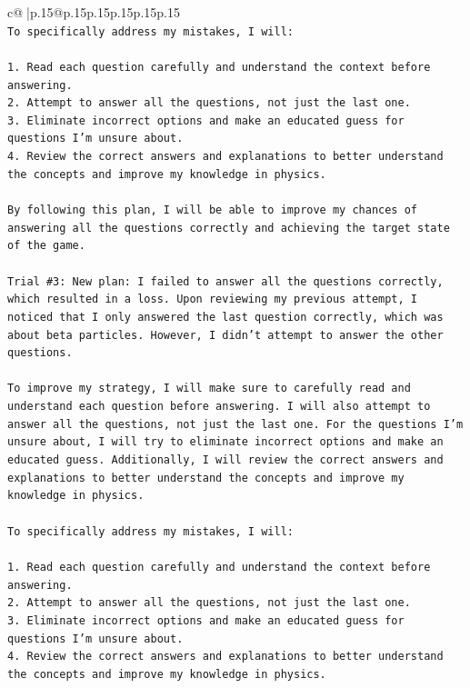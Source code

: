 \documentclass{article}
\begin{document}
{\begin{supertabular}{c@{$\;$}|p{.15\linewidth}@{}p{.15\linewidth}p{.15\linewidth}p{.15\linewidth}p{.15\linewidth}p{.15\linewidth}}
{{{\\ 
\texttt{To specifically address my mistakes, I will:} \\
\\ 
\texttt{1. Read each question carefully and understand the context before answering.} \\
\texttt{2. Attempt to answer all the questions, not just the last one.} \\
\texttt{3. Eliminate incorrect options and make an educated guess for questions I'm unsure about.} \\
\texttt{4. Review the correct answers and explanations to better understand the concepts and improve my knowledge in physics.} \\
\\ 
\texttt{By following this plan, I will be able to improve my chances of answering all the questions correctly and achieving the target state of the game.} \\
\\ 
\texttt{Trial \#3: New plan: I failed to answer all the questions correctly, which resulted in a loss. Upon reviewing my previous attempt, I noticed that I only answered the last question correctly, which was about beta particles. However, I didn't attempt to answer the other questions. } \\
\\ 
\texttt{To improve my strategy, I will make sure to carefully read and understand each question before answering. I will also attempt to answer all the questions, not just the last one. For the questions I'm unsure about, I will try to eliminate incorrect options and make an educated guess. Additionally, I will review the correct answers and explanations to better understand the concepts and improve my knowledge in physics.} \\
\\ 
\texttt{To specifically address my mistakes, I will:} \\
\\ 
\texttt{1. Read each question carefully and understand the context before answering.} \\
\texttt{2. Attempt to answer all the questions, not just the last one.} \\
\texttt{3. Eliminate incorrect options and make an educated guess for questions I'm unsure about.} \\
\texttt{4. Review the correct answers and explanations to better understand the concepts and improve my knowledge in physics.} \\
}}}
\end{supertabular}}
\end{document}
